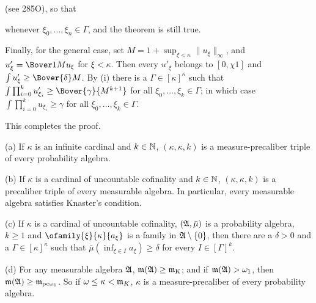 {

\noindent (see 285O), so that


\noindent whenever $\xi_0,\ldots,\xi_n\in\Gamma$, and the theorem is
still true.

\medskip

 Finally, for the general case, set
$M=1+\sup_{\xi<\kappa}\|u_{\xi}\|_{\infty}$, and
$u'_{\xi}=\Bover1Mu_{\xi}$ for $\xi<\kappa$.   Then every $u'_{\xi}$
belongs to $[0,\chi 1]$ and $\int u'_{\xi}\ge\Bover{\delta}M$.   By (i)
there is a $\Gamma\in[\kappa]^{\kappa}$ such that
$\int\prod_{i=0}^ku'_{\xi_i}\ge\Bover{\gamma}{M^{k+1}}$ for all
$\xi_0,\ldots,\xi_k\in\Gamma$;  in which case
$\int\prod_{i=0}^ku_{\xi_i}\ge\gamma$ for all
$\xi_0,\ldots,\xi_k\in\Gamma$.

This completes the proof.
}%

 (a)
If $\kappa$ is an infinite cardinal and
$k\in\Bbb N$, $(\kappa,\kappa,k)$ is a measure-precaliber triple of
every probability algebra.

(b) If $\kappa$ is a cardinal of uncountable cofinality and
$k\in\Bbb N$, $(\kappa,\kappa,k)$ is a precaliber triple of every
measurable algebra.   In particular, every measurable algebra satisfies
Knaster's condition.

(c) If $\kappa$ is a cardinal of uncountable cofinality,
$(\frak A,\bar\mu)$ is a probability algebra, $k\ge 1$ and
$\ofamily{\xi}{\kappa}{a_{\xi}}$ is a family in $\frak A\setminus\{0\}$,
then there are a $\delta>0$ and a $\Gamma\in[\kappa]^{\kappa}$ such that
$\bar\mu(\inf_{\xi\in I}a_{\xi})\ge\delta$ for every $I\in[\Gamma]^k$.

(d)
For any measurable algebra $\frak A$,
$\frak m(\frak A)\ge\frak m_{\text{K}}$;  and if
$\frak m(\frak A)>\omega_1$, then
$\frak m(\frak A)\ge\frak m_{\text{pc}\omega_1}$.
So if $\omega\le\kappa<\frak m_K$, $\kappa$ is a measure-precaliber of
every probability algebra.


